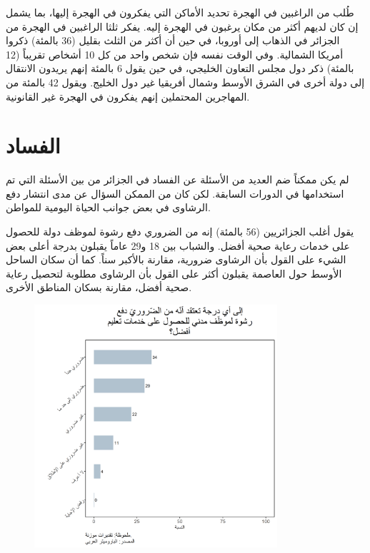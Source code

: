 \documentclass{article}
\begin{document}
 طُلب من الراغبين في الهجرة تحديد الأماكن التي يفكرون في الهجرة إليها، بما يشمل إن كان لديهم أكثر من مكان يرغبون في الهجرة إليه. يفكر ثلثا الراغبين في الهجرة من الجزائر في الذهاب إلى أوروبا، في حين أن أكثر من الثلث بقليل (36 بالمئة) ذكروا أمريكا الشمالية. وفي الوقت نفسه فإن شخص واحد من كل 10 أشخاص تقريباً (12 بالمئة) ذكر دول مجلس التعاون الخليجي، في حين يقول 6 بالمئة إنهم يريدون الانتقال إلى دولة أخرى في الشرق الأوسط وشمال أفريقيا غير دول الخليج. ويقول 42 بالمئة من المهاجرين المحتملين إنهم يفكرون في الهجرة غير القانونية.

\section*{الفساد }

 لم يكن ممكناً ضم العديد من الأسئلة عن الفساد في الجزائر من بين الأسئلة التي تم استخدامها في الدورات السابقة. لكن كان من الممكن السؤال عن مدى انتشار دفع الرشاوى في بعض جوانب الحياة اليومية للمواطن.
	
 يقول أغلب الجزائريين (56 بالمئة) إنه من الضروري دفع رشوة لموظف دولة للحصول على خدمات رعاية صحية أفضل. والشباب بين 18 و29 عاماً يقبلون بدرجة أعلى بعض الشيء على القول بأن الرشاوى ضرورية، مقارنة بالأكبر سناً. كما أن سكان الساحل الأوسط حول العاصمة يقبلون أكثر على القول بأن الرشاوى مطلوبة لتحصيل رعاية صحية أفضل، مقارنة بسكان المناطق الأخرى.
	

			\begin{figure}[H]
				\centering
				\includegraphics[width=9cm]{Q211b.png} 
			\end{figure}
		
\end{document}
